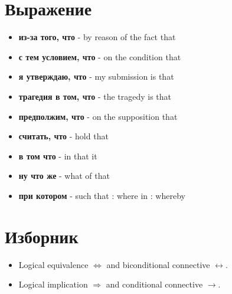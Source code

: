 \documentclass[fleqn,11pt]{article}
\theoremstyle{definition}
\begin{document}
\section{Выражение}
\begin{itemize}
    \item \textbf{из-за того, что} - by reason of the fact that
    \item \textbf{с тем условием, что} - on the condition that
    \item \textbf{я утверждаю, что} - my submission is that
    \item \textbf{трагедия в том, что} - the tragedy is that
    \item \textbf{предполжим, что} - on the supposition that
    \item \textbf{считать, что} - hold that
    \item \textbf{в том что} - in that it
    \item \textbf{ну что же} - what of that
    \item \textbf{при котором} - such that : where in : whereby
\end{itemize}

\section{Изборник}
\begin{itemize}
	\item Logical equivalence $\Leftrightarrow$ and biconditional connective $\leftrightarrow$.
	\item Logical implication $\Rightarrow$ and conditional connective $\rightarrow$.
\end{itemize}
\end{document}

